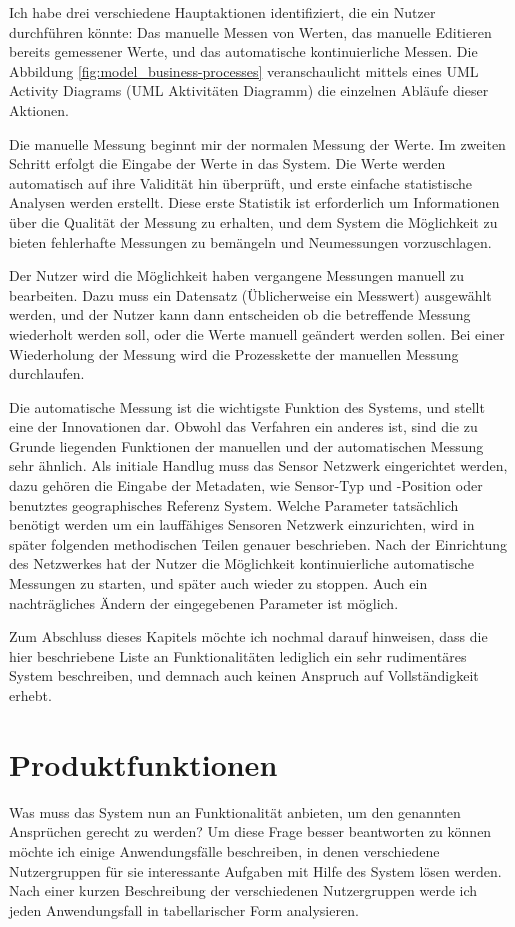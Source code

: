 Ich habe drei verschiedene Hauptaktionen identifiziert, die ein Nutzer durchführen könnte: Das manuelle Messen von Werten, das manuelle Editieren bereits gemessener Werte, und das automatische kontinuierliche Messen. Die Abbildung \ref{fig:model_business-processes} veranschaulicht mittels eines \gls{UML} Activity Diagrams (\gls{UML} Aktivitäten Diagramm) die einzelnen Abläufe dieser Aktionen.

Die manuelle Messung beginnt mir der normalen Messung der Werte. Im zweiten Schritt erfolgt die Eingabe der Werte in das System. Die Werte werden automatisch auf ihre Validität hin überprüft, und erste einfache statistische Analysen werden erstellt. Diese erste Statistik ist erforderlich um Informationen über die Qualität der Messung zu erhalten, und dem System die Möglichkeit zu bieten fehlerhafte Messungen zu bemängeln und Neumessungen vorzuschlagen.

Der Nutzer wird die Möglichkeit haben vergangene Messungen manuell zu bearbeiten. Dazu muss ein Datensatz (Üblicherweise ein Messwert) ausgewählt werden, und der Nutzer kann dann entscheiden ob die betreffende Messung wiederholt werden soll, oder die Werte manuell geändert werden sollen. Bei einer Wiederholung der Messung wird die Prozesskette der manuellen Messung durchlaufen.

Die automatische Messung ist die wichtigste Funktion des Systems, und stellt eine der Innovationen dar. Obwohl das Verfahren ein anderes ist, sind die zu Grunde liegenden Funktionen der manuellen und der automatischen Messung sehr ähnlich. Als initiale Handlug muss das Sensor Netzwerk eingerichtet werden, dazu gehören die Eingabe der Metadaten, wie Sensor-Typ und -Position oder benutztes geographisches Referenz System. Welche Parameter tatsächlich benötigt werden um ein lauffähiges Sensoren Netzwerk einzurichten, wird in später folgenden methodischen Teilen genauer beschrieben. Nach der Einrichtung des Netzwerkes hat der Nutzer die Möglichkeit kontinuierliche automatische Messungen zu starten, und später auch wieder zu stoppen. Auch ein nachträgliches Ändern der eingegebenen Parameter ist möglich.

Zum Abschluss dieses Kapitels möchte ich nochmal darauf hinweisen, dass die hier beschriebene Liste an Funktionalitäten lediglich ein sehr rudimentäres System beschreiben, und demnach auch keinen Anspruch auf Vollständigkeit erhebt.


\section{Produktfunktionen}
Was muss das System nun an Funktionalität anbieten, um den genannten Ansprüchen gerecht zu werden? Um diese Frage besser beantworten zu können möchte ich einige Anwendungsfälle beschreiben, in denen verschiedene Nutzergruppen für sie interessante Aufgaben mit Hilfe des System lösen werden. Nach einer kurzen Beschreibung der verschiedenen Nutzergruppen werde ich jeden Anwendungsfall in tabellarischer Form analysieren.

